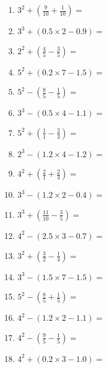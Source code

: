 \documentclass[12pt]{article}
\begin{document}
\begin{enumerate}
\item \large $ 3^{2} + (\frac{9}{10} + \frac{1}{10}) = $ \vspace{1.6cm}
\item \large $ 3^{3} + (0.5 \times 2 - 0.9) = $ \vspace{1.6cm}
\item \large $ 2^{2} + (\frac{4}{5} - \frac{3}{5}) = $ \vspace{1.6cm}
\item \large $ 5^{2} + (0.2 \times 7 - 1.5) = $ \vspace{1.6cm}
\newpage
\item \large $ 5^{2} - (\frac{8}{5} - \frac{1}{5}) = $ \vspace{1.6cm}
\item \large $ 3^{3} - (0.5 \times 4 - 1.1) = $ \vspace{1.6cm}
\item \large $ 5^{2} + (\frac{1}{1} - \frac{2}{3}) = $ \vspace{1.6cm}
\item \large $ 2^{3} - (1.2 \times 4 - 1.2) = $ \vspace{1.6cm}
\item \large $ 4^{2} + (\frac{2}{1} + \frac{2}{3}) = $ \vspace{1.6cm}
\item \large $ 3^{3} - (1.2 \times 2 - 0.4) = $ \vspace{1.6cm}
\item \large $ 3^{3} + (\frac{11}{10} - \frac{3}{5}) = $ \vspace{1.6cm}
\item \large $ 4^{2} - (2.5 \times 3 - 0.7) = $ \vspace{1.6cm}
\item \large $ 3^{2} + (\frac{3}{2} - \frac{1}{4}) = $ \vspace{1.6cm}
\item \large $ 3^{3} - (1.5 \times 7 - 1.5) = $ \vspace{1.6cm}
\newpage
\item \large $ 5^{2} - (\frac{8}{5} + \frac{1}{5}) = $ \vspace{1.6cm}
\item \large $ 4^{2} - (1.2 \times 2 - 1.1) = $ \vspace{1.6cm}
\item \large $ 4^{2} - (\frac{9}{5} - \frac{1}{5}) = $ \vspace{1.6cm}
\item \large $ 4^{2} + (0.2 \times 3 - 1.0) = $ \vspace{1.6cm}

\end{enumerate}
\end{document}
